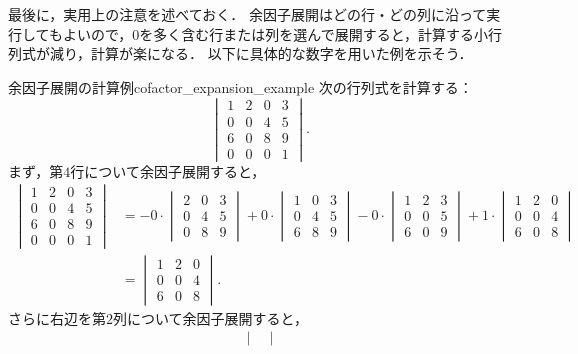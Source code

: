 最後に，実用上の注意を述べておく．
余因子展開はどの行・どの列に沿って実行してもよいので，$0$を多く含む行または列を選んで展開すると，計算する小行列式が減り，計算が楽になる．
以下に具体的な数字を用いた例を示そう．

\begin{example}{余因子展開の計算例}{cofactor_expansion_example}
  次の行列式を計算する：
  \[
  \begin{vmatrix}
    1 & 2 & 0 & 3 \\
    0 & 0 & 4 & 5 \\
    6 & 0 & 8 & 9 \\
    0 & 0 & 0 & 1
  \end{vmatrix}.
  \]
  まず，第$4$行について余因子展開すると，
  \begin{align*}
  \begin{vmatrix}
    1 & 2 & 0 & 3 \\
    0 & 0 & 4 & 5 \\
    6 & 0 & 8 & 9 \\
    0 & 0 & 0 & 1
  \end{vmatrix}
  &=
  -0 \cdot
  \begin{vmatrix}
    2 & 0 & 3 \\
    0 & 4 & 5 \\
    0 & 8 & 9
  \end{vmatrix}
  +0 \cdot
  \begin{vmatrix}
    1 & 0 & 3 \\
    0 & 4 & 5 \\
    6 & 8 & 9
  \end{vmatrix} 
  -0 \cdot
  \begin{vmatrix}
    1 & 2 & 3 \\
    0 & 0 & 5 \\
    6 & 0 & 9
  \end{vmatrix}
  +1 \cdot
  \begin{vmatrix}
    1 & 2 & 0 \\
    0 & 0 & 4 \\
    6 & 0 & 8
  \end{vmatrix} \\
  &=
  \begin{vmatrix}
    1 & 2 & 0 \\
    0 & 0 & 4 \\
    6 & 0 & 8
  \end{vmatrix}.
  \end{align*}
  さらに右辺を第$2$列について余因子展開すると，
  \begin{align*}
  \begin{vmatrix}

\end{vmatrix}
\end{align*}
\end{example}
